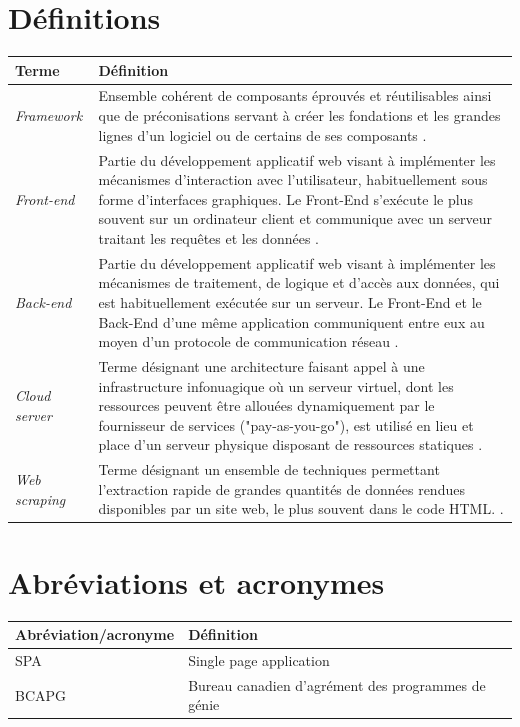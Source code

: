 \documentclass[12pt]{article}
\begin{document}
\section*{Définitions}
\begin{table}[H]
\begin{tabular}{|l|p{12.5cm}|}
\hline
\textbf{Terme} & \textbf{Définition} \\ \hline

\textit{Framework}       &   Ensemble cohérent de composants éprouvés et réutilisables ainsi que
de préconisations servant à créer les fondations et les grandes lignes
d'un logiciel ou de certains de ses composants \cite{defFramework}. \\ \hline


\textit{Front-end}       &   Partie du développement applicatif web visant à implémenter les
mécanismes d'interaction avec l'utilisateur, habituellement sous forme
d'interfaces graphiques. Le Front-End s'exécute le plus souvent sur un
ordinateur client et communique avec un serveur traitant les requêtes et
les données \cite{defFrontBackEnd}. \\ \hline


\textit{Back-end}       &   Partie du développement applicatif web visant à implémenter les
mécanismes de traitement, de logique et d'accès aux données, qui est
habituellement exécutée sur un serveur. Le Front-End et le Back-End d'une même
application communiquent entre eux au moyen d'un protocole de
communication réseau \cite{defFrontBackEnd}. \\ \hline


\textit{Cloud server}      &   Terme désignant une architecture faisant appel à une
infrastructure infonuagique où un serveur virtuel, dont les ressources peuvent
être allouées dynamiquement par le fournisseur de services ("pay-as-you-go"),
est utilisé en lieu et place d'un serveur physique disposant de
ressources  statiques \cite{defServerless}. \\ \hline

\textit{Web scraping}      &   Terme désignant un ensemble de techniques permettant l'extraction rapide de grandes quantités de données rendues disponibles par un site web, le plus souvent dans le code HTML.   \cite{scraping}. \\ \hline


\end{tabular}
\end{table}


\section*{Abréviations et acronymes}
\begin{table}[H]
\begin{tabular}{|l l|}
\hline
\textbf{Abréviation/acronyme} & \textbf{Définition} \\  \hline
SPA & Single page application \\
BCAPG & Bureau canadien d'agrément des programmes de génie \\ \hline
\end{tabular}
\end{table}
\end{document}

